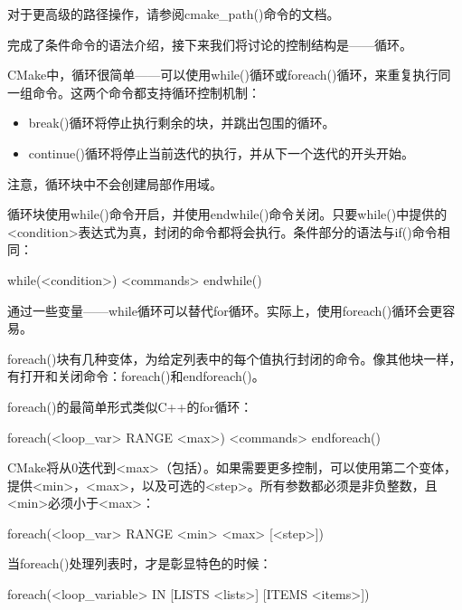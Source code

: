 对于更高级的路径操作，请参阅cmake\_path()命令的文档。

完成了条件命令的语法介绍，接下来我们将讨论的控制结构是——循环。


CMake中，循环很简单——可以使用while()循环或foreach()循环，来重复执行同一组命令。这两个命令都支持循环控制机制：

\begin{itemize}
\item
break()循环将停止执行剩余的块，并跳出包围的循环。

\item
continue()循环将停止当前迭代的执行，并从下一个迭代的开头开始。
\end{itemize}

注意，循环块中不会创建局部作用域。


循环块使用while()命令开启，并使用endwhile()命令关闭。只要while()中提供的<condition>表达式为真，封闭的命令都将会执行。条件部分的语法与if()命令相同：

\begin{shell}
while(<condition>)
    <commands>
endwhile()
\end{shell}

通过一些变量——while循环可以替代for循环。实际上，使用foreach()循环会更容易。


foreach()块有几种变体，为给定列表中的每个值执行封闭的命令。像其他块一样，有打开和关闭命令：foreach()和endforeach()。

foreach()的最简单形式类似C++的for循环：

\begin{shell}
foreach(<loop_var> RANGE <max>)
    <commands>
endforeach()
\end{shell}

CMake将从0迭代到<max>（包括）。如果需要更多控制，可以使用第二个变体，提供<min>，<max>，以及可选的<step>。所有参数都必须是非负整数，且<min>必须小于<max>：

\begin{shell}
foreach(<loop_var> RANGE <min> <max> [<step>])
\end{shell}

当foreach()处理列表时，才是彰显特色的时候：

\begin{shell}
foreach(<loop_variable> IN [LISTS <lists>] [ITEMS <items>])
\end{shell}

